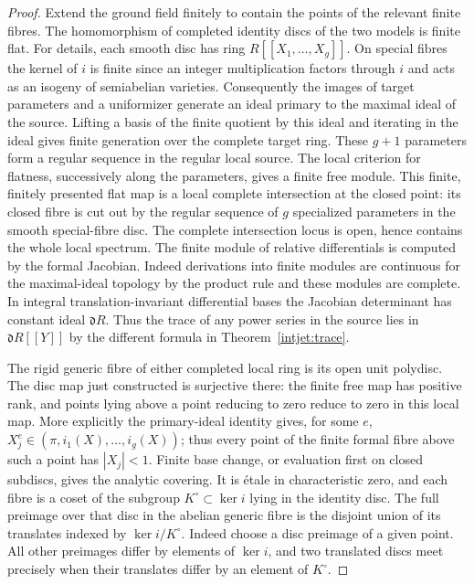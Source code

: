 \begin{proof}
Extend the ground field finitely to contain the points of the
relevant finite fibres. The homomorphism of completed identity
discs of the two models is finite flat. For details, each smooth
disc has ring \(R[[X_1,\ldots,X_g]]\). On special fibres the
kernel of \(i\) is finite since an integer multiplication factors
through \(i\) and acts as an isogeny of semiabelian varieties.
Consequently the images of target parameters and a uniformizer
generate an ideal primary to the maximal ideal of the source.
Lifting a basis of the finite quotient by this ideal and iterating
in the ideal gives finite generation over the complete target ring.
These \(g+1\) parameters form a regular sequence in the regular
local source. The local criterion for flatness, successively along
the parameters, gives a finite free module. This finite, finitely
presented flat map is a local complete intersection at the closed
point: its closed fibre is cut out by the regular sequence of \(g\)
specialized parameters in the smooth special-fibre disc. The complete
intersection locus is open, hence contains the whole local spectrum.
The finite module of relative differentials is computed by the
formal Jacobian. Indeed derivations into finite modules are
continuous for the maximal-ideal topology by the product rule and
these modules are complete. In integral translation-invariant
differential bases the Jacobian determinant has constant ideal
\(\mathfrak d R\). Thus the trace of any power series in the source
lies in \(\mathfrak d R[[Y]]\) by the different formula in
Theorem~\ref{intjet:trace}.

The rigid generic fibre of either completed local ring is its open
unit polydisc. The disc map just constructed is surjective there:
the finite free map has positive rank, and points lying above a
point reducing to zero reduce to zero in this local map. More
explicitly the primary-ideal identity gives, for some \(e\),
\(X_j^e\in(\pi,i_1(X),\ldots,i_g(X))\); thus every point of the
finite formal fibre above such a point has \(|X_j|<1\). Finite
base change, or evaluation first on closed subdiscs, gives the
analytic covering. It is étale in characteristic zero, and each
fibre is a coset of the subgroup \(K^\circ\subset\ker i\) lying in
the identity disc. The full preimage over that disc in the abelian
generic fibre is the disjoint union of its translates indexed by
\(\ker i/K^\circ\). Indeed choose a disc preimage of a given
point. All other preimages differ by elements of \(\ker i\), and
two translated discs meet precisely when their translates differ by
an element of \(K^\circ\).


\end{proof}

